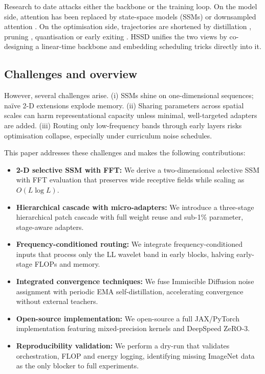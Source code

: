 \documentclass{article}
\begin{document}
Research to date attacks either the backbone or the training loop. On the model side, attention has been replaced by state-space models (SSMs) \cite{yan-2023-diffusion} or downsampled attention \cite{tian-2024-dits}. On the optimisation side, trajectories are shortened by distillation \cite{salimans-2024-multistep}, pruning \cite{fang-2023-structural}, quantisation \cite{so-2023-temporal} or early exiting \cite{moon-2024-simple}. HSSD unifies the two views by co-designing a linear-time backbone and embedding scheduling tricks directly into it.

\subsection{Challenges and overview}
However, several challenges arise. (i) SSMs shine on one-dimensional sequences; naïve 2-D extensions explode memory. (ii) Sharing parameters across spatial scales can harm representational capacity unless minimal, well-targeted adapters are added. (iii) Routing only low-frequency bands through early layers risks optimisation collapse, especially under curriculum noise schedules.

This paper addresses these challenges and makes the following contributions:
\begin{itemize}
  \item \textbf{2-D selective SSM with FFT:} We derive a two-dimensional selective SSM with FFT evaluation that preserves wide receptive fields while scaling as $O(L\log L)$.
  \item \textbf{Hierarchical cascade with micro-adapters:} We introduce a three-stage hierarchical patch cascade with full weight reuse and sub-1\% parameter, stage-aware adapters.
  \item \textbf{Frequency-conditioned routing:} We integrate frequency-conditioned inputs that process only the LL wavelet band in early blocks, halving early-stage FLOPs and memory.
  \item \textbf{Integrated convergence techniques:} We fuse Immiscible Diffusion noise assignment with periodic EMA self-distillation, accelerating convergence without external teachers.
  \item \textbf{Open-source implementation:} We open-source a full JAX/PyTorch implementation featuring mixed-precision kernels and DeepSpeed ZeRO-3.
  \item \textbf{Reproducibility validation:} We perform a dry-run that validates orchestration, FLOP and energy logging, identifying missing ImageNet data as the only blocker to full experiments.
\end{itemize}
\end{document}
